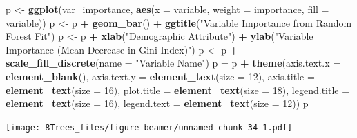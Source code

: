 \documentclass[10pt,ignorenonframetext,]{beamer}
\newenvironment{Shaded}{\begin{snugshade}}{\end{snugshade}}
\newcommand{\KeywordTok}[1]{\textcolor[rgb]{0.13,0.29,0.53}{\textbf{#1}}}
\newcommand{\DataTypeTok}[1]{\textcolor[rgb]{0.13,0.29,0.53}{#1}}
\newcommand{\DecValTok}[1]{\textcolor[rgb]{0.00,0.00,0.81}{#1}}
\newcommand{\StringTok}[1]{\textcolor[rgb]{0.31,0.60,0.02}{#1}}
\newcommand{\OperatorTok}[1]{\textcolor[rgb]{0.81,0.36,0.00}{\textbf{#1}}}
\newcommand{\NormalTok}[1]{#1}
\begin{document}
\begin{frame}[fragile]
\begin{Shaded}
\begin{Highlighting}[]
\NormalTok{p <-}\StringTok{ }\KeywordTok{ggplot}\NormalTok{(var_importance, }\KeywordTok{aes}\NormalTok{(}\DataTypeTok{x =}\NormalTok{ variable, }\DataTypeTok{weight =}\NormalTok{ importance, }\DataTypeTok{fill =}\NormalTok{ variable))}
\NormalTok{p <-}\StringTok{ }\NormalTok{p }\OperatorTok{+}\StringTok{ }\KeywordTok{geom_bar}\NormalTok{() }\OperatorTok{+}\StringTok{ }\KeywordTok{ggtitle}\NormalTok{(}\StringTok{"Variable Importance from Random Forest Fit"}\NormalTok{)}
\NormalTok{p <-}\StringTok{ }\NormalTok{p }\OperatorTok{+}\StringTok{ }\KeywordTok{xlab}\NormalTok{(}\StringTok{"Demographic Attribute"}\NormalTok{) }\OperatorTok{+}\StringTok{ }\KeywordTok{ylab}\NormalTok{(}\StringTok{"Variable Importance (Mean Decrease in Gini Index)"}\NormalTok{)}
\NormalTok{p <-}\StringTok{ }\NormalTok{p }\OperatorTok{+}\StringTok{ }\KeywordTok{scale_fill_discrete}\NormalTok{(}\DataTypeTok{name =} \StringTok{"Variable Name"}\NormalTok{)}
\NormalTok{p =}\StringTok{ }\NormalTok{p }\OperatorTok{+}\StringTok{ }\KeywordTok{theme}\NormalTok{(}\DataTypeTok{axis.text.x =} \KeywordTok{element_blank}\NormalTok{(), }\DataTypeTok{axis.text.y =} \KeywordTok{element_text}\NormalTok{(}\DataTypeTok{size =} \DecValTok{12}\NormalTok{), }
    \DataTypeTok{axis.title =} \KeywordTok{element_text}\NormalTok{(}\DataTypeTok{size =} \DecValTok{16}\NormalTok{), }\DataTypeTok{plot.title =} \KeywordTok{element_text}\NormalTok{(}\DataTypeTok{size =} \DecValTok{18}\NormalTok{), }
    \DataTypeTok{legend.title =} \KeywordTok{element_text}\NormalTok{(}\DataTypeTok{size =} \DecValTok{16}\NormalTok{), }\DataTypeTok{legend.text =} \KeywordTok{element_text}\NormalTok{(}\DataTypeTok{size =} \DecValTok{12}\NormalTok{))}
\NormalTok{p}
\end{Highlighting}
\end{Shaded}

\texttt{[image: 8Trees\_files/figure-beamer/unnamed-chunk-34-1.pdf]}

\end{frame}
\end{document}
